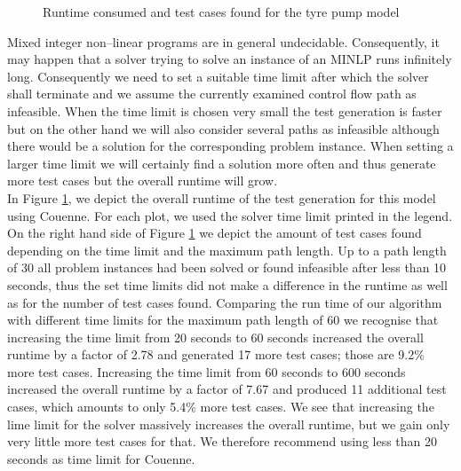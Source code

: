 \documentclass[runningheads,a4paper]{llncs}%
\begin{document}
\begin{figure}
%
\caption{Runtime consumed and test cases found for the tyre pump model%
}%
\label{fig:ExplodingTyresRuntime}%
\end{figure}%
Mixed integer non--linear programs are in general undecidable. Consequently, it may happen that a solver trying to solve an instance of an MINLP runs infinitely long. Consequently we need to set a suitable time limit after which the solver shall terminate and we assume the currently examined control flow path as infeasible. When the time limit is chosen very small the test generation is faster but on the other hand we will also consider several paths as infeasible although there would be a solution for the corresponding problem instance. When setting a larger time limit we will certainly find a solution more often and thus generate more test cases but the overall runtime will grow.\\
In Figure \ref{fig:ExplodingTyresRuntime}, we depict the overall runtime of the test generation for this model using Couenne. For each plot, we used the solver time limit printed in the legend. On the right hand side of Figure \ref{fig:ExplodingTyresRuntime} we depict the amount of test cases found depending on the time limit and the maximum path length. Up to a path length of 30 all problem instances had been solved or found infeasible after less than 10 seconds, thus the set time limits did not make a difference in the runtime as well as for the number of test cases found. Comparing the run time of our algorithm with different time limits for the maximum path length of 60 we recognise that increasing the time limit from 20 seconds to 60 seconds increased the overall runtime by a factor of 2.78 and generated 17 more test cases; those are 9.2\% more test cases. Increasing the time limit from 60 seconds to 600 seconds increased the overall runtime by a factor of 7.67 and produced 11 additional test cases, which amounts to only 5.4\% more test cases. We see that increasing the lime limit for the solver massively increases the overall runtime, but we gain only very little more test cases for that. We therefore recommend using less than 20 seconds as time limit for Couenne.
\end{document}
